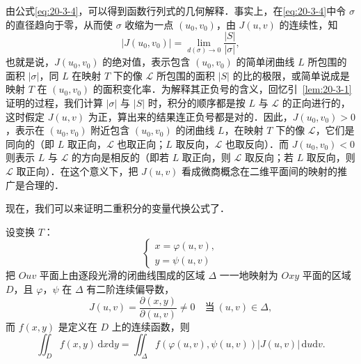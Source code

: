 由公式\eqref{eq:20-3-4}，可以得到函数行列式的几何解释．事实上，在\eqref{eq:20-3-4}中令 $\sigma$ 的直径趋向于零，从而使 $\sigma$ 收缩为一点 $(u_{0},v_{0})$，由 $J(u,v)$ 的连续性，知
\[
\left|J(u_{0},v_{0})\right|=\lim_{d(\sigma)\to 0}\frac{\left|S\right|}{\left|\sigma\right|},
\]
也就是说，$J(u_{0},v_{0})$ 的绝对值，表示包含 $(u_{0},v_{0})$ 的简单闭曲线 $L$ 所包围的面积 $\left|\sigma\right|$，同 $L$ 在映射 $T$ 下的像 $\mathcal{L}$ 所包围的面积 $\left|S\right|$ 的比的极限，或简单说成是映射 $T$ 在 $(u_{0},v_{0})$ 的面积变化率．为解释其正负号的含义，回忆引~\ref{lem:20-3-1} 证明的过程，我们计算 $\left|\sigma\right|$ 与 $\left|S\right|$ 时，积分的顺序都是按 $L$ 与 $\mathcal{L}$ 的正向进行的，这时假定 $J(u,v)$ 为正，算出来的结果连正负号都是对的．因此，$J(u_{0},v_{0})>0$，表示在 $(u_{0},v_{0})$ 附近包含 $(u_{0},v_{0})$ 的闭曲线 $L$，在映射 $T$ 下的像 $\mathcal{L}$，它们是同向的（即 $L$ 取正向，$\mathcal{L}$ 也取正向；$L$ 取反向，$\mathcal{L}$ 也取反向）．而 $J(u_{0},v_{0})<0$ 则表示 $L$ 与 $\mathcal{L}$ 的方向是相反的（即若 $L$ 取正向，则 $\mathcal{L}$ 取反向；若 $L$ 取反向，则 $\mathcal{L}$ 取正向）．在这个意义下，把 $J(u,v)$ 看成微商概念在二维平面间的映射的推广是合理的．

现在，我们可以来证明二重积分的变量代换公式了．

\begin{theorem}\label{thm:20-3}
设变换 $T$：
\[
\begin{cases}
x=\varphi(u,v),\\
y=\psi(u,v)
\end{cases}
\]
把 $Ouv$ 平面上由逐段光滑的闭曲线围成的区域 $\Delta$ 一一地映射为 $Oxy$ 平面的区域 $D$，且 $\varphi$，$\psi$ 在 $\Delta$ 有二阶连续偏导数，
\[
J(u,v)=\frac{\partial(x,y)}{\partial(u,v)}\neq 0\quad\text{当}\ (u,v)\in\Delta,
\]
而 $f(x,y)$ 是定义在 $D$ 上的连续函数，则
\[
\iint_{D}f(x,y)\,\mathrm{d}x\mathrm{d}y=\iint_{\Delta}f\left(\varphi(u,v),\psi(u,v)\right)\left|J(u,v)\right|\,\mathrm{d}u\mathrm{d}v.
\]
\end{theorem}

